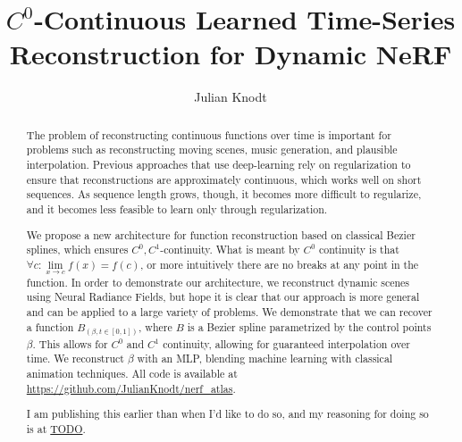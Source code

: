 \documentclass[10pt,twocolumn,letterpaper]{article}
\begin{document}
\title{$C^0$-Continuous Learned Time-Series Reconstruction for Dynamic NeRF}
\author{Julian Knodt}

\maketitle

\begin{abstract}
The problem of reconstructing continuous functions over time is important for problems such as reconstructing moving scenes, music generation, and plausible interpolation.
Previous approaches that use deep-learning rely on regularization to ensure that reconstructions are approximately continuous, which works well on short sequences. As sequence length grows, though, it becomes more difficult to regularize, and it becomes less feasible to learn only through regularization.

We propose a new architecture for function reconstruction based on classical Bezier splines, which ensures $C^0, C^1$-continuity. What is meant by $C^0$ continuity is that $\forall c:\lim\limits_{x\to c} f(x) = f(c)$, or more intuitively there are no breaks at any point in the function. In order to demonstrate our architecture, we reconstruct dynamic scenes using Neural Radiance Fields, but hope it is clear that our approach is more general and can be applied to a large
variety of problems. We demonstrate that we can recover a function $B_(\beta, t\in[0,1])$, where $B$ is a Bezier spline
parametrized by the control points $\beta$. This allows for $C^0$ and $C^1$ continuity, allowing for guaranteed interpolation over time. We reconstruct $\beta$ with an MLP, blending machine learning with classical animation techniques. All code is available at \url{https://github.com/JulianKnodt/nerf_atlas}.

I am publishing this earlier than when I'd like to do so, and my reasoning for doing so is at \url{TODO}.
\end{abstract}
\end{document}
